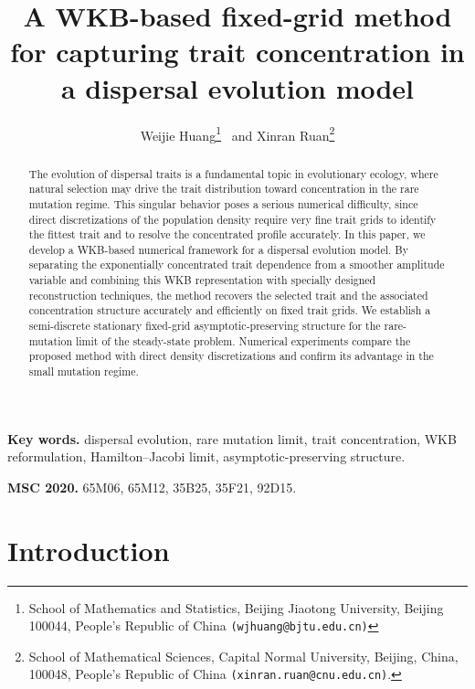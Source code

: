 \documentclass[11pt]{article}
\title{A WKB-based fixed-grid method for capturing trait concentration in a dispersal evolution model}
\author{
Weijie Huang\thanks{School of Mathematics and Statistics, Beijing Jiaotong University, Beijing 100044, People's Republic of China {\tt (wjhuang@bjtu.edu.cn)}} \ and
Xinran Ruan\thanks{School of Mathematical Sciences, Capital Normal University, Beijing, China, 100048, People's Republic of China {\tt (xinran.ruan@cnu.edu.cn)}.}
}
\begin{document}
\date{}
\maketitle

\begin{abstract}
The evolution of dispersal traits is a fundamental topic in evolutionary ecology, 
where natural selection may drive the trait distribution toward concentration in the rare mutation regime. 
This singular behavior poses a serious numerical difficulty, 
since direct discretizations of the population density require very fine trait grids to identify the fittest trait and to resolve the concentrated profile accurately. 
In this paper, we develop a WKB-based numerical framework for a dispersal evolution model. 
By separating the exponentially concentrated trait dependence from a smoother
amplitude variable and combining this WKB representation with specially
designed reconstruction techniques, the method recovers the selected trait and
the associated concentration structure accurately and efficiently on fixed trait grids. 
We establish a semi-discrete stationary fixed-grid asymptotic-preserving structure for the rare-mutation limit of the steady-state problem.
Numerical experiments compare the proposed method with
direct density discretizations and confirm its advantage in the small mutation
regime.
\end{abstract}

{\bf Key words. } dispersal evolution, rare mutation limit, trait concentration, WKB reformulation, Hamilton--Jacobi limit, asymptotic-preserving structure.

{\bf MSC 2020. } 65M06, 65M12, 35B25, 35F21, 92D15.


\section{Introduction}
\end{document}
